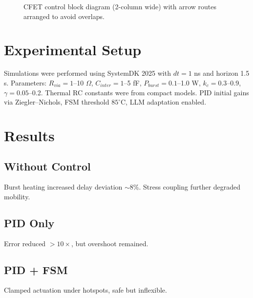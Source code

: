 \documentclass[conference]{IEEEtran}
\begin{document}
\begin{figure}[t!]
{%
} %
\caption{CFET control block diagram (2-column wide) with arrow routes arranged to avoid overlaps.}
\label{fig:model_tikz}
\end{figure}

\section{Experimental Setup}
Simulations were performed using SystemDK 2025 with $dt=1$ ns and horizon 1.5 s. Parameters:  
$R_{via}=1$--10 $\Omega$, $C_{inter}=1$--5 fF, $P_{burst}=0.1$--1.0 W, $k_c=0.3$--0.9, $\gamma=0.05$--0.2.  
Thermal RC constants were from compact models. PID initial gains via Ziegler–Nichols, FSM threshold $85^\circ$C, LLM adaptation enabled.

\section{Results}
\subsection{Without Control}
Burst heating increased delay deviation $\sim$8\%. Stress coupling further degraded mobility.  
\subsection{PID Only}
Error reduced $>10\times$, but overshoot remained.  
\subsection{PID + FSM}
Clamped actuation under hotspots, safe but inflexible.  
\end{document}
